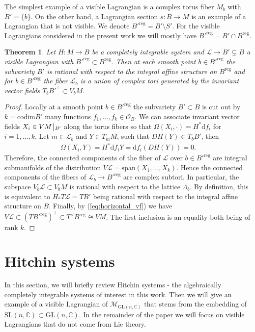 \documentclass[10pt,a4paper]{amsart}
\numberwithin{equation}{section}
\newtheorem{theo}{Theorem}[section]
\theoremstyle{definition}
\newcommand{\reg}{\mathrm{reg}}
\newcommand{\codim}{\mathrm{codim}}
\newcommand{\rest}{\: \rule[-3.5pt]{0.5pt}{11.5pt}\,{}}
\renewcommand{\to}{\rightarrow}
\newcommand{\calL}{\mathcal{L}}
\newcommand{\calM}{\mathcal{M}}
\newcommand{\calO}{\mathcal{O}}
\newcommand{\CC}{\mathbb{C}}
\newcommand{\GL}{\mathrm{GL}}
\newcommand{\SL}{\mathrm{SL}}
\begin{document}
The simplest example of a visible Lagrangian is a complex torus fiber $M_b$ with $B'=\{ b \}$. On the other hand, a Lagrangian section $s\colon B \to M$ is an example of a Lagrangian that is not visible. We denote $B'^{\reg}=B'\setminus S'$. For the visible Lagrangians considered in the present work we will mostly have $B'^\reg=B' \cap B^\reg$.

\begin{theo}\label{theo:visible_Lagr} Let $H\colon M \to B$ be a completely integrable system and $\calL \to B' \subsetneq B$ a visible Lagrangian with $B'^\reg \subset B^\reg$. Then at each smooth point $b \in B'^\reg$ the subvariety $B'$ is rational with respect to the integral affine structure on $B^\reg$ and for $b \in B'^\reg$ the fiber $\calL_b$ is a union of complex tori generated by the invariant vector fields $T_bB'^\perp \subset V_bM$.
\end{theo}
\begin{proof} Locally at a smooth point $b \in B'^\reg$ the subvariety $B' \subset B$ is cut out by $k=\codim B'$ many functions $f_1,\dots,f_k\in \calO_B$. We can associate invariant vector fields $X_i \in VM\rest_{B'}$ along the torus fibers so that $\Omega(X_i, \cdot)= H^* \mathrm{d} f_i$ for $i=1,\dots,k$. Let $m \in \calL_b$ and $Y \in T_mM$, such that $DH(Y) \in T_bB'$, then
 \begin{align} \Omega(X_i,Y)=H^*\mathrm{d}f_i Y=\mathrm{d}f_i(DH(Y)) = 0. \label{eq:horizontal_vf}
 \end{align}
 Therefore, the connected components of the fiber of $\calL$ over $b \in B'^\reg$ are integral submanifolds of the distribution $V\calL=\mathrm{span}(X_1, \dots, X_k)$. Hence the connected components of the fibers of $\calL_b \to B'^\reg$ are complex subtori. In particular, the subspace $V_b\calL \subset V_bM$ is rational with respect to the lattice $\Lambda_b$. By definition, this is equivalent to $H_*T\calL=TB'$ being rational with respect to the integral affine structure on $B$. Finally, by (\ref{eq:horizontal_vf}) we have $ V\calL \subset (TB'^\reg)^\perp \subset T^\vee B^\reg \cong VM$. The first inclusion is an equality both being of rank $k$.
\end{proof}

\section{Hitchin systems \label{sec:hitchin-systems}}
In this section, we will briefly review Hitchin systems - the algebraically completely integrable systems of interest in this work. Then we will give an example of a visible Lagrangian of $\calM_{\GL(n,\CC)}$ that stems from the embedding of $\SL(n,\CC) \subset \GL(n,\CC)$. In the remainder of the paper we will focus on visible Lagrangians that do not come from Lie theory.
\end{document}
